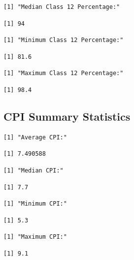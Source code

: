 \documentclass[
  letterpaper,
  DIV=11,
  numbers=noendperiod]{scrartcl}
\begin{document}
\begin{verbatim}
[1] "Median Class 12 Percentage:"
\end{verbatim}

\begin{verbatim}
[1] 94
\end{verbatim}

\begin{verbatim}
[1] "Minimum Class 12 Percentage:"
\end{verbatim}

\begin{verbatim}
[1] 81.6
\end{verbatim}

\begin{verbatim}
[1] "Maximum Class 12 Percentage:"
\end{verbatim}

\begin{verbatim}
[1] 98.4
\end{verbatim}

\hypertarget{cpi-summary-statistics}{%
\subsection{CPI Summary Statistics}\label{cpi-summary-statistics}}

\begin{verbatim}
[1] "Average CPI:"
\end{verbatim}

\begin{verbatim}
[1] 7.490588
\end{verbatim}

\begin{verbatim}
[1] "Median CPI:"
\end{verbatim}

\begin{verbatim}
[1] 7.7
\end{verbatim}

\begin{verbatim}
[1] "Minimum CPI:"
\end{verbatim}

\begin{verbatim}
[1] 5.3
\end{verbatim}

\begin{verbatim}
[1] "Maximum CPI:"
\end{verbatim}

\begin{verbatim}
[1] 9.1
\end{verbatim}
\end{document}
